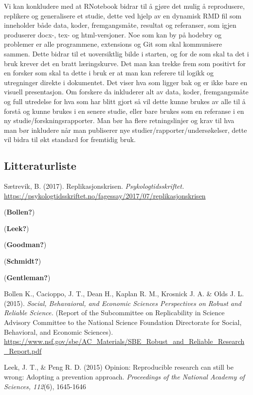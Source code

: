 \documentclass[
  12pt,
]{article}
\begin{document}
Vi kan konkludere med at RNotebook bidrar til å gjøre det mulig å
reprodusere, replikere og generalisere et studie, dette ved hjelp av en
dynamisk RMD fil som inneholder både data, koder, fremgangsmåte,
resultat og referanser, som igjen produserer docx-, tex- og
html-versjoner. Noe som kan by på hodebry og problemer er alle
programmene, extensions og Git som skal kommunisere sammen. Dette bidrar
til et uoversiktlig bilde i starten, og for de som skal ta det i bruk
krever det en bratt læringskurve. Det man kan trekke frem som positivt
for en forsker som skal ta dette i bruk er at man kan referere til
logikk og utregninger direkte i dokumentet. Det viser hva som ligger bak
og er ikke bare en visuell presentasjon. Om forskere da inkluderer alt
av data, koder, fremgangsmåte og full utredelse for hva som har blitt
gjort så vil dette kunne brukes av alle til å forstå og kunne brukes i
en senere studie, eller bare brukes som en referanse i en ny
studie/forskningsrapporter. Man bør ha flere retningslinjer og krav til
hva man bør inkludere når man publiserer nye
studier/rapporter/undersøkelser, dette vil bidra til økt standard for
fremtidig bruk.

\hypertarget{litteraturliste}{%
\subsection{Litteraturliste}\label{litteraturliste}}

Sætrevik, B. (2017). Replikasjonskrisen. \emph{Psykologtidsskriftet.}
\url{https://psykologtidsskriftet.no/fagessay/2017/07/replikasjonskrisen}

(\textbf{Bollen?})

(\textbf{Leek?})

(\textbf{Goodman?})

(\textbf{Schmidt?})

(\textbf{Gentleman?})

Bollen K., Cacioppo, J. T., Dean H., Kaplan R. M., Krosnick J. A. \&
Olds J. L. (2015). \emph{Social, Behavaioral, and Economic Sciences
Perspectives on Robust and Reliable Science.} (Report of the
Subcommittee on Replicability in Science Advisory Committee to the
National Science Foundation Directorate for Social, Behavioral, and
Economic Sciences).
\url{https://www.nsf.gov/sbe/AC_Materials/SBE_Robust_and_Reliable_Research_Report.pdf}

\hfill\break
Leek, J. T., \& Peng R. D. (2015) Opinion: Reproducible research can
still be wrong: Adopting a prevention approach. \emph{Proceedings of the
National Academy of Sciences, 112}(6), 1645-1646
\end{document}
